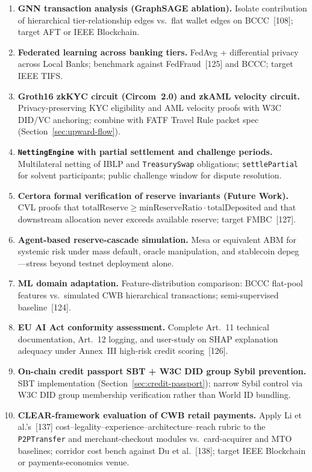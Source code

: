 \documentclass[12pt,a4paper]{report}
\begin{document}
\begin{enumerate}[noitemsep]
\item \textbf{GNN transaction analysis (GraphSAGE ablation).}\label{sec:gnn-extension}
Isolate contribution of hierarchical tier-relationship edges vs.\ flat wallet edges on BCCC~[108]; target AFT or IEEE Blockchain.
\item \textbf{Federated learning across banking tiers.}\label{sec:fl-fraud}
FedAvg + differential privacy across Local Banks; benchmark against FedFraud~[125] and BCCC; target IEEE TIFS.
\item \textbf{Groth16 zkKYC circuit (Circom~2.0) and zkAML velocity circuit.}
Privacy-preserving KYC eligibility and AML velocity proofs with W3C DID/VC anchoring; combine with FATF Travel Rule packet spec (Section~\ref{sec:upward-flow}).
\item \textbf{\texttt{NettingEngine} with partial settlement and challenge periods.}
Multilateral netting of IBLP and \texttt{TreasurySwap} obligations; \texttt{settlePartial} for solvent participants; public challenge window for dispute resolution.
\item \textbf{Certora formal verification of reserve invariants (Future Work).}\label{sec:certora}
CVL proofs that \(\mathrm{totalReserve} \ge \mathrm{minReserveRatio} \cdot \mathrm{totalDeposited}\) and that downstream allocation never exceeds available reserve; target FMBC~[127].
\item \textbf{Agent-based reserve-cascade simulation.} Mesa or equivalent ABM for systemic risk under mass default, oracle manipulation, and stablecoin depeg---stress beyond testnet deployment alone.
\item \textbf{ML domain adaptation.} Feature-distribution comparison: BCCC flat-pool features vs.\ simulated CWB hierarchical transactions; semi-supervised baseline~[124].
\item \textbf{EU AI Act conformity assessment.} Complete Art.~11 technical documentation, Art.~12 logging, and user-study on SHAP explanation adequacy under Annex~III high-risk credit scoring~[126].
\item \textbf{On-chain credit passport SBT + W3C DID group Sybil prevention.} SBT implementation (Section~\ref{sec:credit-passport}); narrow Sybil control via W3C DID group membership verification rather than World ID bundling.
\item \textbf{CLEAR-framework evaluation of CWB retail payments.} Apply Li et al.'s~[137] cost--legality--experience--architecture--reach rubric to the \texttt{P2PTransfer} and merchant-checkout modules vs.\ card-acquirer and MTO baselines; corridor cost bench against Du et al.~[138]; target IEEE Blockchain or payments-economics venue.
\end{enumerate}
\end{document}
